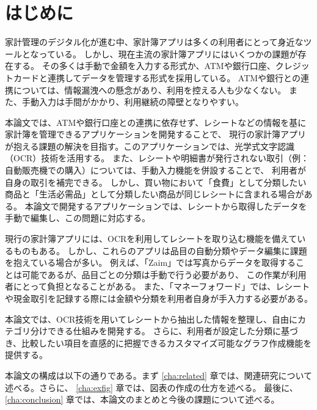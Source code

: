 \documentclass[main]{subfiles}
\begin{document}
\chapter{はじめに}
\label{cha:intro}

家計管理のデジタル化が進む中、家計簿アプリは多くの利用者にとって身近なツールとなっている。
しかし、現在主流の家計簿アプリにはいくつかの課題が存在する。
その多くは手動で金額を入力する形式か、ATMや銀行口座、クレジットカードと連携してデータを管理する形式を採用している。
ATMや銀行との連携については、情報漏洩への懸念があり、利用を控える人も少なくない。
また、手動入力は手間がかかり、利用継続の障壁となりやすい。

本論文では、ATMや銀行口座との連携に依存せず、レシートなどの情報を基に家計簿を管理できるアプリケーションを開発することで、
現行の家計簿アプリが抱える課題の解決を目指す。このアプリケーションでは、光学式文字認識（OCR）技術を活用する。
また、レシートや明細書が発行されない取引（例：自動販売機での購入）については、手動入力機能を併設することで、
利用者が自身の取引を補完できる。
しかし、買い物において「食費」として分類したい商品と「生活必需品」として分類したい商品が同じレシートに含まれる場合がある。
本論文で開発するアプリケーションでは、レシートから取得したデータを手動で編集し、この問題に対応する。

現行の家計簿アプリには、OCRを利用してレシートを取り込む機能を備えているものもある。
しかし、これらのアプリは品目の自動分類やデータ編集に課題を抱えている場合が多い。
例えば、「Zaim」では写真からデータを取得することは可能であるが、品目ごとの分類は手動で行う必要があり、
この作業が利用者にとって負担となることがある。
また、「マネーフォワード」では、レシートや現金取引を記録する際には金額や分類を利用者自身が手入力する必要がある。

本論文では、OCR技術を用いてレシートから抽出した情報を整理し、自由にカテゴリ分けできる仕組みを開発する。
さらに、利用者が設定した分類に基づき、比較したい項目を直感的に把握できるカスタマイズ可能なグラフ作成機能を提供する。

本論文の構成は以下の通りである。まず \ref{cha:related} 章では、関連研究について述べる。さらに、
\ref{cha:exfig} 章では、図表の作成の仕方を述べる。
最後に、\ref{cha:conclusion} 章では、本論文のまとめと今後の課題について述べる。
\end{document}
